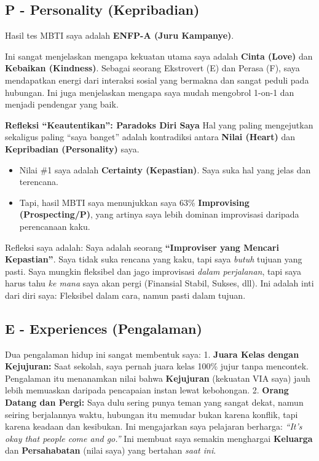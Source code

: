 \documentclass[
  letterpaper,
  DIV=11,
  numbers=noendperiod]{scrreprt}
\providecommand{\tightlist}{%
  \setlength{\itemsep}{0pt}\setlength{\parskip}{0pt}}
\begin{document}
\subsection{P - Personality
(Kepribadian)}\label{p---personality-kepribadian}

Hasil tes MBTI saya adalah \textbf{ENFP-A (Juru Kampanye)}.

Ini sangat menjelaskan mengapa kekuatan utama saya adalah \textbf{Cinta
(Love)} dan \textbf{Kebaikan (Kindness)}. Sebagai seorang Ekstrovert (E)
dan Perasa (F), saya mendapatkan energi dari interaksi sosial yang
bermakna dan sangat peduli pada hubungan. Ini juga menjelaskan mengapa
saya mudah mengobrol 1-on-1 dan menjadi pendengar yang baik.

\textbf{Refleksi ``Keautentikan'': Paradoks Diri Saya} Hal yang paling
mengejutkan sekaligus paling ``saya banget'' adalah kontradiksi antara
\textbf{Nilai (Heart)} dan \textbf{Kepribadian (Personality)} saya.

\begin{itemize}
\tightlist
\item
  Nilai \#1 saya adalah \textbf{Certainty (Kepastian)}. Saya suka hal
  yang jelas dan terencana.
\item
  Tapi, hasil MBTI saya menunjukkan saya 63\% \textbf{Improvising
  (Prospecting/P)}, yang artinya saya lebih dominan improvisasi daripada
  perencanaan kaku.
\end{itemize}

Refleksi saya adalah: Saya adalah seorang \textbf{``Improviser yang
Mencari Kepastian''}. Saya tidak suka rencana yang kaku, tapi saya
\emph{butuh} tujuan yang pasti. Saya mungkin fleksibel dan jago
improvisasi \emph{dalam perjalanan}, tapi saya harus tahu \emph{ke mana}
saya akan pergi (Finansial Stabil, Sukses, dll). Ini adalah inti dari
diri saya: Fleksibel dalam cara, namun pasti dalam tujuan.

\subsection{E - Experiences
(Pengalaman)}\label{e---experiences-pengalaman}

Dua pengalaman hidup ini sangat membentuk saya: \textbar{} 1.
\textbf{Juara Kelas dengan Kejujuran:} Saat sekolah, saya pernah juara
kelas 100\% jujur tanpa mencontek. Pengalaman itu menanamkan nilai bahwa
\textbf{Kejujuran} (kekuatan VIA saya) jauh lebih memuaskan daripada
pencapaian instan lewat kebohongan. \textbar{} 2. \textbf{Orang Datang
dan Pergi:} Saya dulu sering punya teman yang sangat dekat, namun
seiring berjalannya waktu, hubungan itu memudar bukan karena konflik,
tapi karena keadaan dan kesibukan. Ini mengajarkan saya pelajaran
berharga: \emph{``It's okay that people come and go.''} Ini membuat saya
semakin menghargai \textbf{Keluarga} dan \textbf{Persahabatan} (nilai
saya) yang bertahan \emph{saat ini}.
\end{document}
